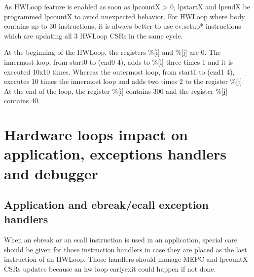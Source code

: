 \documentclass[letterpaper,10pt,english]{sphinxmanual}
\begin{document}
\sphinxAtStartPar
As HWLoop feature is enabled as soon as lpcountX \textgreater{} 0, lpstartX and lpendX  be programmed  lpcountX to avoid unexpected behavior.
For HWLoop where body contains up to 30 instructions, it is always better to use cv.setup* instructions which are updating all 3 HWLoop CSRs in the same cycle.

\sphinxAtStartPar
At the beginning of the HWLoop, the registers \%{[}i{]} and \%{[}j{]} are 0.
The innermost loop, from start0 to (end0 \sphinxhyphen{} 4), adds to \%{[}i{]} three times 1 and
it is executed 10x10 times. Whereas the outermost loop, from start1 to (end1 \sphinxhyphen{} 4),
executes 10 times the innermost loop and adds two times 2 to the register \%{[}j{]}.
At the end of the loop, the register \%{[}i{]} contains 300 and the register \%{[}j{]} contains 40.


\section{Hardware loops impact on application, exceptions handlers and debugger}
\label{\detokenize{corev_hw_loop:hardware-loops-impact-on-application-exceptions-handlers-and-debugger}}\label{\detokenize{corev_hw_loop:hwloop-exceptions-handlers}}

\subsection{Application and ebreak/ecall exception handlers}
\label{\detokenize{corev_hw_loop:application-and-ebreak-ecall-exception-handlers}}
\sphinxAtStartPar
When an ebreak or an ecall instruction is used in an application, special care should be given for those instruction handlers in case they are placed as the last instruction of an HWLoop.
Those handlers should manage MEPC and lpcountX CSRs updates because an hw loop early\sphinxhyphen{}exit could happen if not done.
\end{document}
